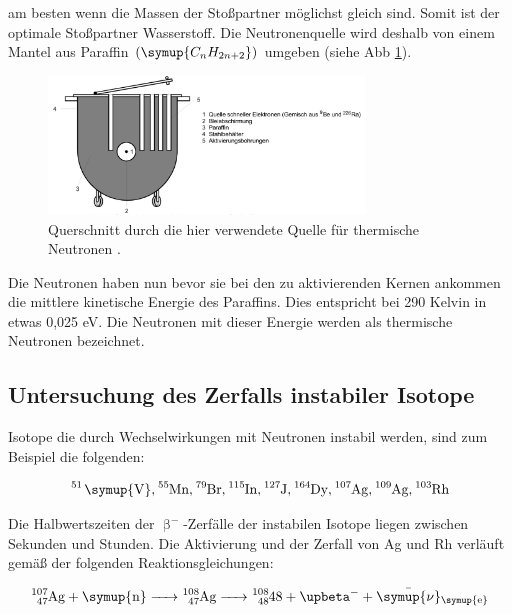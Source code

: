 \noindent am besten wenn die Massen der Stoßpartner möglichst gleich sind. Somit ist der optimale Stoßpartner Wasserstoff. Die Neutronenquelle wird 
deshalb von einem Mantel aus Paraffin $\left( \symup{C_n H_{2n+2}} \right)$ umgeben (siehe Abb \ref{img:Paraffin}).

\begin{figure}[H]
   \centering
   \includegraphics[width=0.75\textwidth]{images/Theorie1.PNG}
   \caption{Querschnitt durch die hier verwendete Quelle für thermische Neutronen \protect \cite{V702}.}
   \label{img:Paraffin}
\end{figure}

\noindent Die Neutronen haben nun bevor sie bei den zu aktivierenden Kernen ankommen die mittlere kinetische Energie des Paraffins. Dies entspricht 
bei 290 Kelvin in etwas 0,025 eV. Die Neutronen mit dieser Energie werden als thermische Neutronen bezeichnet. 

\subsection{Untersuchung des Zerfalls instabiler Isotope}

\noindent Isotope die durch Wechselwirkungen mit Neutronen instabil werden, sind zum Beispiel die folgenden:

\begin{equation*}
   \ce{^{51} \symup{V}, ^{55}\text{Mn}, ^{79}\text{Br}, ^{115}\text{In}, ^{127}\text{J}, ^{164}\text{Dy}, ^{107}{Ag}, ^{109}\text{Ag}, ^{103}\text{Rh}} \nonumber
\end{equation*}

\noindent Die Halbwertszeiten der $\upbeta ^-$-Zerfälle der instabilen Isotope liegen zwischen Sekunden und Stunden. Die Aktivierung und der 
Zerfall von Ag und Rh verläuft gemäß der folgenden Reaktionsgleichungen:

\begin{equation}
   \ce{^{107}_{47}\text{Ag} + \symup{n} -> ^{108}_{47}\text{Ag} -> ^{108}_{48}\text{48} + $\upbeta$^- + \bar{\symup{\nu}}_{\symup{e}}} 
   \label{eq:Ag107}
\end{equation}


